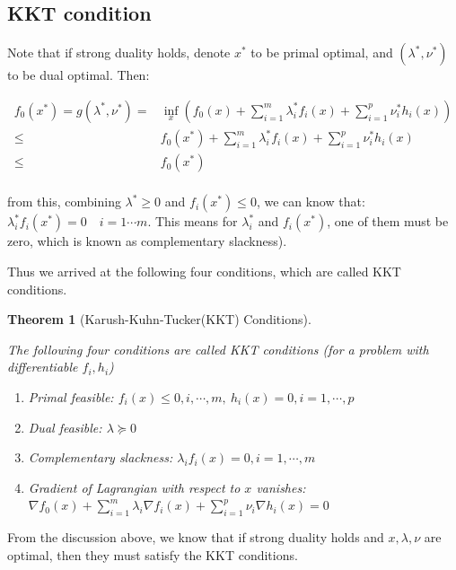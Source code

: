 \documentclass[
]{book}
\providecommand{\tightlist}{%
  \setlength{\itemsep}{0pt}\setlength{\parskip}{0pt}}
\newtheorem{theorem}{Theorem}[chapter]
\theoremstyle{definition}
\theoremstyle{definition}
\theoremstyle{definition}
\theoremstyle{definition}
\theoremstyle{remark}
\begin{document}
\hypertarget{appconvex-theory-kkt}{%
\subsection{KKT condition}\label{appconvex-theory-kkt}}

Note that if strong duality holds, denote \(x^*\) to be primal optimal, and \((\lambda^*,\nu^*)\) to be dual optimal. Then:

\begin{equation}
  \begin{aligned}
  f_0(x^*) = g(\lambda^*,\nu^*) = & \inf_x(f_0(x)+\sum_{i=1}^m\lambda_i^*f_i(x)+\sum_{i=1}^p\nu_i^*h_i(x))\\
 \leq & f_0(x^*)+\sum_{i=1}^m\lambda_i^*f_i(x)+\sum_{i=1}^p\nu_i^*h_i(x)\\
 \leq & f_0(x^*)\\
  \end{aligned}
  \end{equation}

from this, combining \(\lambda^*\geq 0\) and \(f_i(x^*)\leq 0\), we can know that: \(\lambda_i^*f_i(x^*)=0\quad i=1\cdots m\). This means for \(\lambda_i^*\) and \(f_i(x^*)\), one of them must be zero, which is known as complementary slackness).

Thus we arrived at the following four conditions, which are called KKT conditions.

\begin{theorem}[Karush-Kuhn-Tucker(KKT) Conditions]
\protect\hypertarget{thm:KKT}{}\label{thm:KKT}

The following four conditions are called KKT conditions (for a problem with differentiable \(f_i,h_i\))

\begin{enumerate}
\def\labelenumi{\arabic{enumi}.}
\tightlist
\item
  Primal feasible: \(f_i(x) \leq 0,i,\cdots ,m,\ h_i(x) = 0,i=1,\cdots ,p\)
\item
  Dual feasible: \(\lambda\succeq0\)
\item
  Complementary slackness: \(\lambda_if_i(x)=0,i=1,\cdots,m\)
\item
  Gradient of Lagrangian with respect to \(x\) vanishes:\(\nabla f_0(x)+\sum_{i=1}^m\lambda_i\nabla f_i(x)+\sum_{i=1}^p\nu_i\nabla h_i(x) = 0\)
\end{enumerate}

\end{theorem}

From the discussion above, we know that if strong duality holds and \(x,\lambda,\nu\) are optimal, then they must satisfy the KKT conditions.
\end{document}
